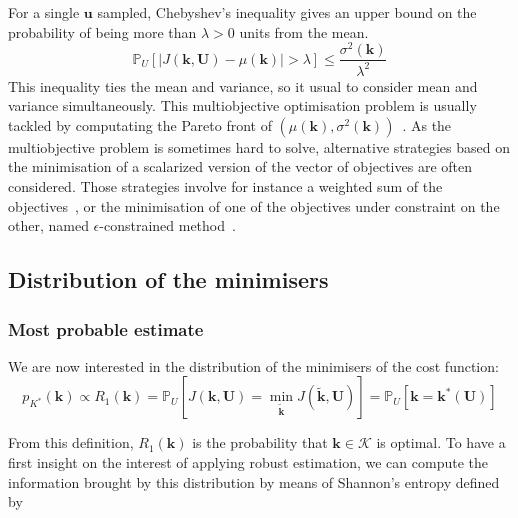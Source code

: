 \documentclass[npg, manuscript]{copernicus}
\newcommand{\Prob}{\mathbb{P}}
\begin{document}
For a single $\mathbf{u}$ sampled, Chebyshev's inequality gives an upper bound on the probability of being more than $\lambda>0$ units from the mean.
\begin{equation}
  \label{eq:cheby_ineq}
  \Prob_U\left[|J(\mathbf{k}%
    ,\mathbf{U}) - \mu(\mathbf{k}%
    )|> \lambda\right] \leq \frac{\sigma^2(\mathbf{k}%
    )}{\lambda^2}
\end{equation}
This inequality ties the mean and variance, so it usual to consider mean and variance simultaneously. This multiobjective optimisation problem is usually tackled by computating the Pareto front of $\left(\mu(\mathbf{k}),\sigma^2(\mathbf{k})\right)$~\citep{baudoui_optimisation_2012}. As the multiobjective problem is sometimes hard to solve, alternative strategies based on the minimisation of a scalarized version of the vector of objectives are often considered. Those strategies involve for instance a weighted sum of the objectives~\citep{grodzevich_normalization_2006}, or the minimisation of one of the objectives under constraint on the other, named $\epsilon$-constrained method~\citep[applied for instance in][]{lehman_designing_2004}.




\subsection{Distribution of the minimisers}
\subsubsection{Most probable estimate}
We are now interested in the distribution of the minimisers of the cost function:
\begin{equation}
  \label{eq:def_R1}
  p_{K^*}(\mathbf{k}) \propto R_1(\mathbf{k}) = \Prob_U\left[J(\mathbf{k},\mathbf{U}) = \min_{\tilde{\mathbf{k}}} J(\tilde{\mathbf{k}},\mathbf{U}) \right] = \Prob_U\left[\mathbf{k}= \mathbf{k}^*(\mathbf{U})\right]
\end{equation}

From this definition, $R_1(\mathbf{k})$ is the probability that $\mathbf{k} \in \mathcal{K}$ is optimal.
To have a first insight on the interest of applying robust estimation, we can compute the information brought by this distribution by means of Shannon's entropy defined by
\end{document}
